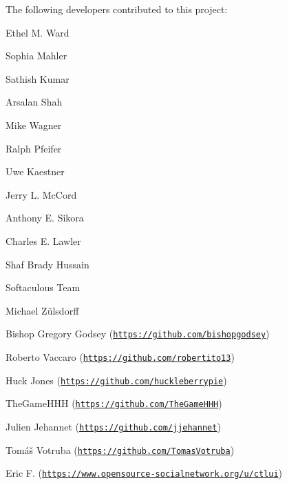 The following developers contributed to this project\+:


\begin{DoxyItemize}
\item Ethel M. Ward
\item Sophia Mahler
\item Sathish Kumar
\item Arsalan Shah
\item Mike Wagner
\item Ralph Pfeifer
\item Uwe Kaestner
\item Jerry L. Mc\+Cord
\item Anthony E. Sikora
\item Charles E. Lawler
\item Shaf Brady Hussain
\item Softaculous Team
\item Michael Zülsdorff
\item Bishop Gregory Godsey (\href{https://github.com/bishopgodsey}{\tt https\+://github.\+com/bishopgodsey})
\item Roberto Vaccaro (\href{https://github.com/robertito13}{\tt https\+://github.\+com/robertito13})
\item Huck Jones (\href{https://github.com/huckleberrypie}{\tt https\+://github.\+com/huckleberrypie})
\item The\+Game\+H\+HH (\href{https://github.com/TheGameHHH}{\tt https\+://github.\+com/\+The\+Game\+H\+HH})
\item Julien Jehannet (\href{https://github.com/jjehannet}{\tt https\+://github.\+com/jjehannet})
\item Tomáš Votruba (\href{https://github.com/TomasVotruba}{\tt https\+://github.\+com/\+Tomas\+Votruba})
\item Eric F. (\href{https://www.opensource-socialnetwork.org/u/ctlui}{\tt https\+://www.\+opensource-\/socialnetwork.\+org/u/ctlui}) 
\end{DoxyItemize}